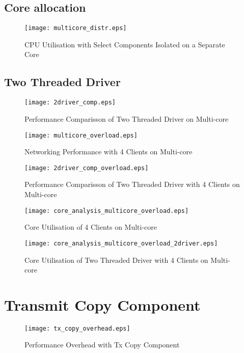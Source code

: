 \subsection{Core allocation}

\begin{figure}[h]
    \centering
    \texttt{[image: multicore\_distr.eps]}
    \caption{CPU Utilisation with Select Components Isolated on a Separate Core}
    \label{f:multicore_distr}
\end{figure}

\subsection{Two Threaded Driver}

\begin{figure}[h]
    \centering
    \texttt{[image: 2driver\_comp.eps]}
    \caption{Performance Comparisson of Two Threaded Driver on Multi-core}
    \label{f:2driver_comp}
\end{figure}

\begin{figure}[h]
    \centering
    \texttt{[image: multicore\_overload.eps]}
    \caption{Networking Performance with 4 Clients on Multi-core}
    \label{f:multicore_overload}
\end{figure}

\begin{figure}[h]
    \centering
    \texttt{[image: 2driver\_comp\_overload.eps]}
    \caption{Performance Comparisson of Two Threaded Driver with 4 Clients on Multi-core}
    \label{f:2driver_comp_overload}
\end{figure}

\begin{figure}[h]
    \centering
    \texttt{[image: core\_analysis\_multicore\_overload.eps]}
    \caption{Core Utilisation of 4 Clients on Multi-core}
    \label{f:core_analysis_mutlicore_overload}
\end{figure}

\begin{figure}[h]
    \centering
    \texttt{[image: core\_analysis\_multicore\_overload\_2driver.eps]}
    \caption{Core Utilisation of Two Threaded Driver with 4 Clients on Multi-core}
    \label{f:core_analysis_mutlicore_overload_2driver}
\end{figure}

\section{Transmit Copy Component}

\begin{figure}[h]
    \centering
    \texttt{[image: tx\_copy\_overhead.eps]}
    \caption{Performance Overhead with Tx Copy Component}
    \label{f:tx_copy_overhead}
\end{figure}
